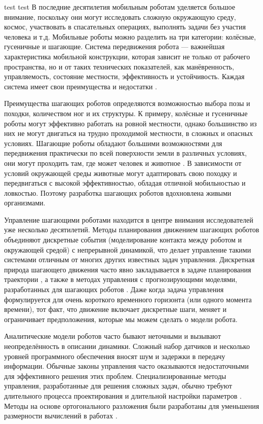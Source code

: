 {\actuality} 

test test
В последние десятилетия мобильным роботам уделяется большое внимание, поскольку они могут исследовать сложную окружающую среду, космос, участвовать в спасательных операциях, выполнять задачи без участия человека и т.д. Мобильные роботы можно разделить на три категории: колёсные, гусеничные и шагающие. Система передвижения робота --- важнейшая характеристика мобильной конструкции, которая зависит не только от рабочего пространства, но и от таких технических показателей, как манёвренность, управляемость, состояние местности, эффективность и устойчивость. Каждая система имеет свои преимущества и недостатки \cite{zhong2019}.

Преимущества шагающих роботов определяются возможностью выбора позы и походки, количеством ног и их структуры. К примеру, колёсные и гусеничные роботы могут эффективно работать на ровной местности, однако большинство из них не могут двигаться на трудно проходимой местности, в сложных и опасных условиях. Шагающие роботы обладают большими возможностями для передвижения практически по всей поверхности земли в различных условиях, они могут проходить там, где может человек и животное \cite{Silva2012}. В зависимости от условий окружающей среды животные могут адаптировать свою походку и передвигаться с высокой эффективностью, обладая отличной мобильностью и ловкостью. Поэтому разработка шагающих роботов вдохновлена живыми организмами.

Управление шагающими роботами находится в центре внимания исследователей уже несколько десятилетий. Методы планирования движением шагающих роботов объединяют дискретные события (моделирование контакта между роботом и окружающей средой) с непрерывной динамикой, что делает управление такими системами отличным от многих других известных задач управления. Дискретная природа шагающего движения часто явно закладывается в задаче планирования траектории \cite{katayama2022whole, lu2023whole}, а также в методах управления с прогнозирующими моделями, разработанных для шагающих роботов \cite{KIM2019, chignoli2021humanoid}. Даже когда задача управления формулируется для очень короткого временного горизонта (или одного момента времени), тот факт, что движение включает дискретные шаги, меняет и ограничивает предположения, которые мы можем сделать о модели робота.

Аналитические модели роботов часто бывают неточными и вызывают неопределённость в описании динамики. Сложный набор датчиков и несколько уровней программного обеспечения вносят шум и задержки в передачу информации. Обычные законы управления часто оказываются недостаточными для эффективного решения этих проблем. Специализированные методы управления, разработанные для решения сложных задач, обычно требуют длительного процесса проектирования и длительной настройки параметров \cite{underactuated}. Методы на основе ортогонального разложения были разработаны для уменьшения размерности вычислений в работах \cite{Schur, mason2014full}.

